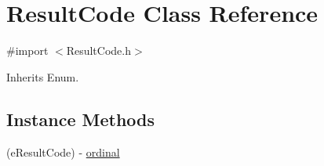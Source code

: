 \hypertarget{interface_result_code}{}\section{Result\+Code Class Reference}
\label{interface_result_code}


{\ttfamily \#import $<$Result\+Code.\+h$>$}



Inherits Enum.

\subsection*{Instance Methods}
\begin{DoxyCompactItemize}
\item 
(e\+Result\+Code) -\/ \hyperlink{interface_result_code_ada8a8c0d4405cf0fb59bb6234207469c}{ordinal}
\end{DoxyCompactItemize}

